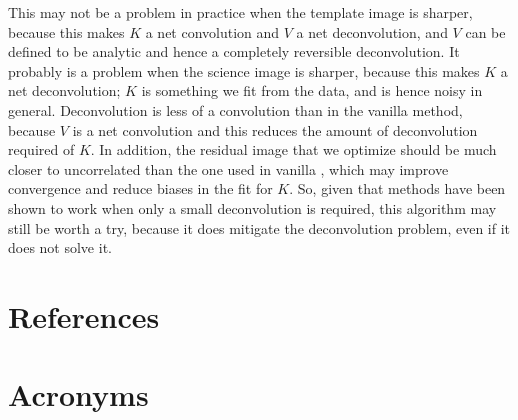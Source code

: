 \documentclass[DM,authoryear,toc]{lsstdoc}
\newcommand{\AL}{\citetalias{1998ApJ...503..325A}}
\begin{document}
This may not be a problem in practice when the template image is sharper, because this makes $K$ a net convolution and $V$ a net deconvolution, and $V$ can be defined to be analytic and hence a completely reversible deconvolution.
It probably is a problem when the science image is sharper, because this makes $K$ a net deconvolution; $K$ is something we fit from the data, and is hence noisy in general.
Deconvolution is less of a convolution than in the vanilla \AL{} method, because $V$ is a net convolution and this reduces the amount of deconvolution required of $K$.
In addition, the residual image that we optimize should be much closer to uncorrelated than the one used in vanilla \AL{}, which may improve convergence and reduce biases in the fit for $K$.
So, given that \AL{} methods have been shown to work when only a small deconvolution is required, this algorithm may still be worth a try, because it does mitigate the deconvolution problem, even if it does not solve it.


\appendix
\section{References} \label{sec:bib}
\renewcommand{\refname}{} %


\section{Acronyms} \label{sec:acronyms}

\end{document}
